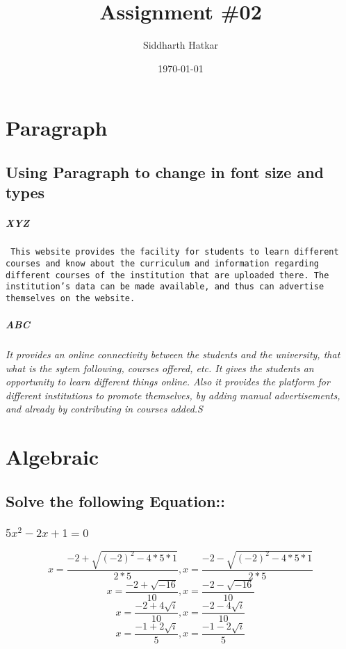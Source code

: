 \documentclass{report}
\title{Assignment \#02}
\date{\today}
\author{Siddharth Hatkar}
\begin{document}
	{\huge
	\maketitle
	}
	\newpage
	\tableofcontents
	\chapter{Paragraph}
	\section{\large{Using Paragraph to change in font size and types}}
	\paragraph{XYZ}
	\texttt{
		This website provides the facility for students to learn different courses and know about the curriculum and information regarding different courses of the institution that are uploaded there. The institution’s data can be made available, and thus can advertise themselves on the website.
	}
	\paragraph{ABC}
	\textit{\small
		 It provides an online connectivity between the students and the university, that what is the sytem following, courses offered, etc. It gives the students an opportunity to learn different things online. Also it provides the platform for different institutions to promote themselves, by adding manual advertisements, and already by contributing in courses added.S
	}
	\newline
	\chapter{Algebraic}
	\section{\large{Solve the following Equation:: }}
	\subsection{$5x^2 -2x+ 1 = 0$}
		
		$$x = \frac{-2+\sqrt{(-2)^2-4*5*1}}{2*5} , x = \frac{-2-\sqrt{(-2)^2-4*5*1}}{2*5}$$
		\newline \newline
		$$x = \frac{-2+\sqrt{-16}}{10} , x = \frac{-2-\sqrt{-16}}{10}$$
		\newline \newline
		$$x = \frac{-2+4\sqrt{i}}{10} , x = \frac{-2-4\sqrt{i}}{10}$$
		\newline \newline
		$$x = \frac{-1+2\sqrt{i}}{5} , x = \frac{-1-2\sqrt{i}}{5}$$
		\newline \newline
	
\end{document}
